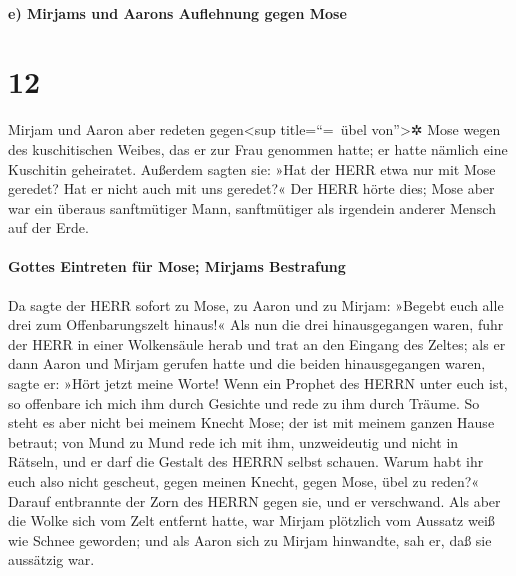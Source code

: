 \hypertarget{e-mirjams-und-aarons-auflehnung-gegen-mose}{%
\paragraph{e) Mirjams und Aarons Auflehnung gegen
Mose}\label{e-mirjams-und-aarons-auflehnung-gegen-mose}}

\hypertarget{section-11}{%
\section{12}\label{section-11}}

Mirjam und Aaron aber redeten gegen\textless sup
title=``=~übel von''\textgreater✲ Mose wegen des kuschitischen Weibes,
das er zur Frau genommen hatte; er hatte nämlich eine Kuschitin
geheiratet. Außerdem sagten sie: »Hat der HERR etwa nur
mit Mose geredet? Hat er nicht auch mit uns geredet?« Der
HERR hörte dies; Mose aber war ein überaus sanftmütiger Mann,
sanftmütiger als irgendein anderer Mensch auf der Erde.

\hypertarget{gottes-eintreten-fuxfcr-mose-mirjams-bestrafung}{%
\paragraph{Gottes Eintreten für Mose; Mirjams
Bestrafung}\label{gottes-eintreten-fuxfcr-mose-mirjams-bestrafung}}

Da sagte der HERR sofort zu Mose, zu Aaron und zu Mirjam:
»Begebt euch alle drei zum Offenbarungszelt hinaus!« Als nun die drei
hinausgegangen waren, fuhr der HERR in einer Wolkensäule
herab und trat an den Eingang des Zeltes; als er dann Aaron und Mirjam
gerufen hatte und die beiden hinausgegangen waren, sagte
er: »Hört jetzt meine Worte! Wenn ein Prophet des HERRN unter euch ist,
so offenbare ich mich ihm durch Gesichte und rede zu ihm durch Träume.
So steht es aber nicht bei meinem Knecht Mose; der ist mit
meinem ganzen Hause betraut; von Mund zu Mund rede ich mit
ihm, unzweideutig und nicht in Rätseln, und er darf die Gestalt des
HERRN selbst schauen. Warum habt ihr euch also nicht gescheut, gegen
meinen Knecht, gegen Mose, übel zu reden?« Darauf
entbrannte der Zorn des HERRN gegen sie, und er verschwand.
Als aber die Wolke sich vom Zelt entfernt hatte, war
Mirjam plötzlich vom Aussatz weiß wie Schnee geworden; und als Aaron
sich zu Mirjam hinwandte, sah er, daß sie aussätzig war.

